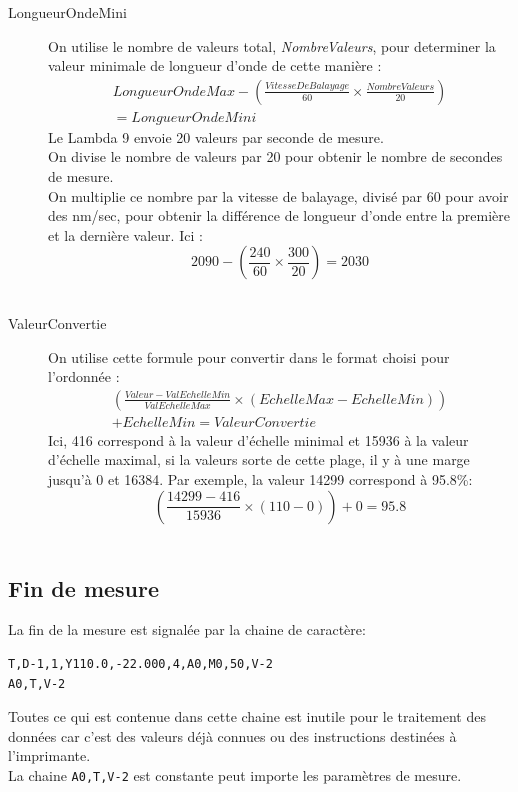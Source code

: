 \documentclass[a4paper, 12pt]{article}
\begin{document}
\begin{description}
	\item[LongueurOndeMini] On utilise le nombre de valeurs total, \emph{NombreValeurs}, pour determiner la valeur minimale de longueur d'onde de cette manière :
		\begin{multline*}
			 LongueurOndeMax - \left ( \frac{VitesseDeBalayage}{60} \times \frac{NombreValeurs}{20} \right ) 
			\\ = LongueurOndeMini 
\end{multline*}
		Le Lambda 9 envoie 20 valeurs par seconde de mesure.\\
		On divise le nombre de valeurs par 20 pour obtenir le nombre de secondes de mesure.\\
		On multiplie ce nombre par la vitesse de balayage, divisé par 60 pour avoir des nm/sec, pour obtenir la différence de longueur d'onde entre la première et la dernière valeur.
		Ici :
		$$ 2090 - \left ( \frac{240}{60} \times \frac{300}{20} \right ) = 2030 $$ \\


	\item[ValeurConvertie] On utilise cette formule pour convertir dans le format choisi pour l'ordonnée :
		\begin{multline*}
		 \left ( \frac{Valeur - ValEchelleMin}{ValEchelleMax} \times (EchelleMax - EchelleMin) \right ) 
			\\ + EchelleMin = ValeurConvertie 
			\end{multline*}
		Ici, 416 correspond à la valeur d'échelle minimal et 15936 à la valeur d'échelle maximal, si la valeurs sorte de cette plage, il y à une marge jusqu'à 0 et 16384.
		Par exemple, la valeur 14299 correspond à 95.8\%: 
		$$ \left (\frac{14299-416}{15936} \times ( 110 - 0 ) \right ) + 0 = 95.8$$\\

\end{description}

\subsection{Fin de mesure}\label{fin}
La fin de la mesure est signalée par la chaine de caractère:
\begin{lstlisting}
T,D-1,1,Y110.0,-22.000,4,A0,M0,50,V-2
A0,T,V-2
\end{lstlisting}

Toutes ce qui est contenue dans cette chaine est inutile pour le traitement des données car c'est des valeurs déjà connues ou des instructions destinées à l'imprimante.\\
La chaine \verb|A0,T,V-2| est constante peut importe les paramètres de mesure.
\end{document}
